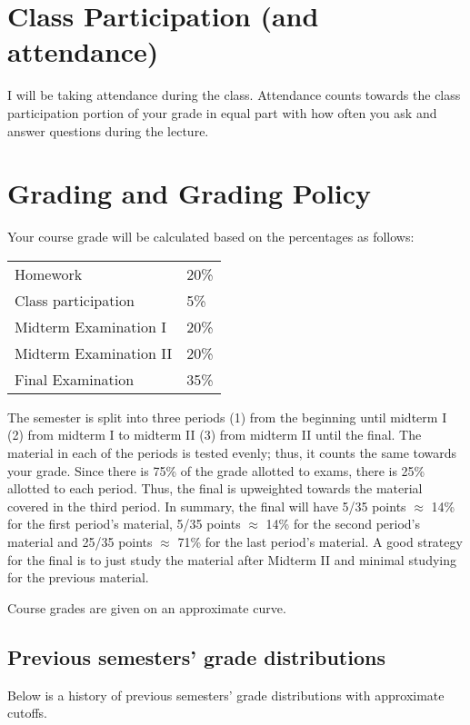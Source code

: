 \documentclass[12pt]{article}
\begin{document}
\section*{Class Participation (and attendance)}

I will be taking attendance during the class. Attendance counts towards the class participation portion of your grade in equal part with how often you ask and answer questions during the lecture.


\section*{Grading and Grading Policy}\label{sec:grading}

Your course grade will be calculated based on the percentages as follows: 

\begin{table}[h]
\centering
\begin{tabular}{l|l}
Homework & 20\% \\
Class participation & 5\% \\
Midterm Examination I & 20\%\\
Midterm Examination II & 20\%\\
Final Examination & 35\%
\end{tabular}
\end{table}
\FloatBarrier

The semester is split into three periods (1) from the beginning until midterm I (2) from midterm I to midterm II (3) from midterm II until the final. The material in each of the periods is tested evenly; thus, it counts the same towards your grade. Since there is 75\% of the grade allotted to exams, there is 25\% allotted to each period. Thus, the final is upweighted towards the material covered in the third period. In summary, the final will have 5/35 points $\approx$ 14\% for the first period's material, 5/35 points $\approx$ 14\% for the second period's material and 25/35 points $\approx$ 71\% for the last period's material. A good strategy for the final is to just study the material after Midterm II and minimal studying for the previous material.

Course grades are given on an approximate curve.

\subsection*{Previous semesters' grade distributions}

Below is a history of previous semesters' grade distributions with approximate cutoffs.
\end{document}
